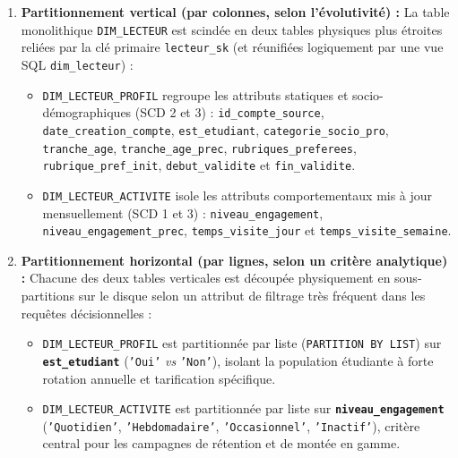 \documentclass[a4paper,12pt]{article}
\begin{document}
\begin{enumerate}
  \item \textbf{Partitionnement vertical (par colonnes, selon l'évolutivité) :} La table monolithique \texttt{DIM\_LECTEUR} est scindée en deux tables physiques plus étroites reliées par la clé primaire \texttt{lecteur\_sk} (et réunifiées logiquement par une vue SQL \texttt{dim\_lecteur}) :
  \begin{itemize}
    \item \texttt{DIM\_LECTEUR\_PROFIL} regroupe les attributs statiques et socio-démographiques (SCD 2 et 3) : \texttt{id\_compte\_source}, \texttt{date\_creation\_compte}, \texttt{est\_etudiant}, \texttt{categorie\_socio\_pro}, \texttt{tranche\_age}, \texttt{tranche\_age\_prec}, \texttt{rubriques\_preferees}, \texttt{rubrique\_pref\_init}, \texttt{debut\_validite} et \texttt{fin\_validite}.
    \item \texttt{DIM\_LECTEUR\_ACTIVITE} isole les attributs comportementaux mis à jour mensuellement (SCD 1 et 3) : \texttt{niveau\_engagement}, \texttt{niveau\_engagement\_prec}, \texttt{temps\_visite\_jour} et \texttt{temps\_visite\_semaine}.
  \end{itemize}

  \item \textbf{Partitionnement horizontal (par lignes, selon un critère analytique) :} Chacune des deux tables verticales est découpée physiquement en sous-partitions sur le disque selon un attribut de filtrage très fréquent dans les requêtes décisionnelles :
  \begin{itemize}
    \item \texttt{DIM\_LECTEUR\_PROFIL} est partitionnée par liste (\texttt{PARTITION BY LIST}) sur \textbf{\texttt{est\_etudiant}} (\texttt{'Oui'} \emph{vs} \texttt{'Non'}), isolant la population étudiante à forte rotation annuelle et tarification spécifique.
    \item \texttt{DIM\_LECTEUR\_ACTIVITE} est partitionnée par liste sur \textbf{\texttt{niveau\_engagement}} (\texttt{'Quotidien'}, \texttt{'Hebdomadaire'}, \texttt{'Occasionnel'}, \texttt{'Inactif'}), critère central pour les campagnes de rétention et de montée en gamme.
  \end{itemize}
\end{enumerate}
\end{document}

